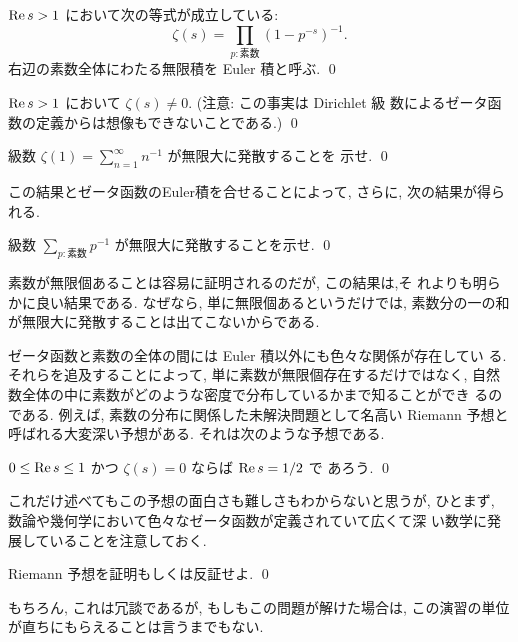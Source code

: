\documentclass[12pt,twoside]{jarticle}
\begin{document}
\begin{question}[Euler積]
  $\mathop{\mathrm{Re}}\nolimits s > 1$ において次の等式が成立している:
  \[
    \zeta(s) = \prod_{p:\text{素数}} (1 - p^{-s})^{-1}.
  \]%
  右辺の素数全体にわたる無限積を Euler 積と呼ぶ.
  \qed
\end{question}

\begin{question}
  $\mathop{\mathrm{Re}}\nolimits s > 1$ において $\zeta(s) \ne 0$. (注意: この事実は Dirichlet 級
  数によるゼータ函数の定義からは想像もできないことである.)  \qed
\end{question}

\begin{question}
  級数 $\zeta(1) = \sum_{n=1}^{\infty}n^{-1}$ が無限大に発散することを
  示せ. \qed
\end{question}

\noindent この結果とゼータ函数のEuler積を合せることによって, さらに, 
次の結果が得られる.

\begin{question}
  級数 
  \(
    \displaystyle
    \sum_{p : \text{素数}} p^{-1}
  \)
  が無限大に発散することを示せ. 
  \qed
\end{question}

\noindent 素数が無限個あることは容易に証明されるのだが, この結果は,そ
れよりも明らかに良い結果である. なぜなら, 単に無限個あるというだけでは,
素数分の一の和が無限大に発散することは出てこないからである. 

ゼータ函数と素数の全体の間には Euler 積以外にも色々な関係が存在してい
る. それらを追及することによって, 単に素数が無限個存在するだけではなく, 
自然数全体の中に素数がどのような密度で分布しているかまで知ることができ
るのである. 例えば, 素数の分布に関係した未解決問題として名高い Riemann 
予想と呼ばれる大変深い予想がある. それは次のような予想である.

\begin{conjecture}[Riemann]\label{Riemann-Hypothesis}
  $0\le \mathop{\mathrm{Re}}\nolimits s \le 1$ かつ $\zeta(s)=0$ ならば $\mathop{\mathrm{Re}}\nolimits s = 1/2$ で
  あろう. 
  \qed
\end{conjecture}

\noindent これだけ述べてもこの予想の面白さも難しさもわからないと思うが, 
ひとまず, 数論や幾何学において色々なゼータ函数が定義されていて広くて深
い数学に発展していることを注意しておく.

\begin{question}
  Riemann 予想を証明もしくは反証せよ. \qed
\end{question}

\noindent もちろん, これは冗談であるが, もしもこの問題が解けた場合は, 
この演習の単位が直ちにもらえることは言うまでもない. 
\end{document}

